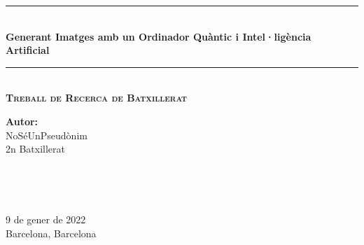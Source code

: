 \documentclass[a4paper,12pt,arial,numbered,print,oneside]{book}
\newcommand{\HRule}{\rule{\linewidth}{0.5mm}}
\begin{document}
	\begin{titlepage}
		
		\begin{center}
		\begin{singlespace}%

		
		\HRule \\[0.4cm]
		{ \Huge \bfseries Generant Imatges amb un Ordinador Quàntic i Intel·ligència Artificial}\\[0.1cm] 
		\HRule \\[1.1cm]
		
		\textsc{\Large \textbf{Treball de Recerca de Batxillerat}}\\[.5cm]
		
		
		\vspace{11cm}
		\begin{minipage}{0.48\textwidth}
			\begin{flushleft} \large
				\Large \textbf{Autor:}\\
				\Large NoSéUnPseudònim \\ 2n Batxillerat \\ 
			\end{flushleft}
		\end{minipage}
		~
		\begin{minipage}{0.48\textwidth}
			\begin{flushright} \large
			\end{flushright}
		\end{minipage}\\
		
		\vspace{1.5cm}
		\begin{minipage}{0.85\textwidth}
		\end{minipage}
		
		\vspace{1.5cm}
		
		
		{\large 9 de gener de 2022} \\
		\large Barcelona, Barcelona  
		
		
		\vfill %
		\end{singlespace}
		\end{center}
		
	\end{titlepage}
\end{document}
